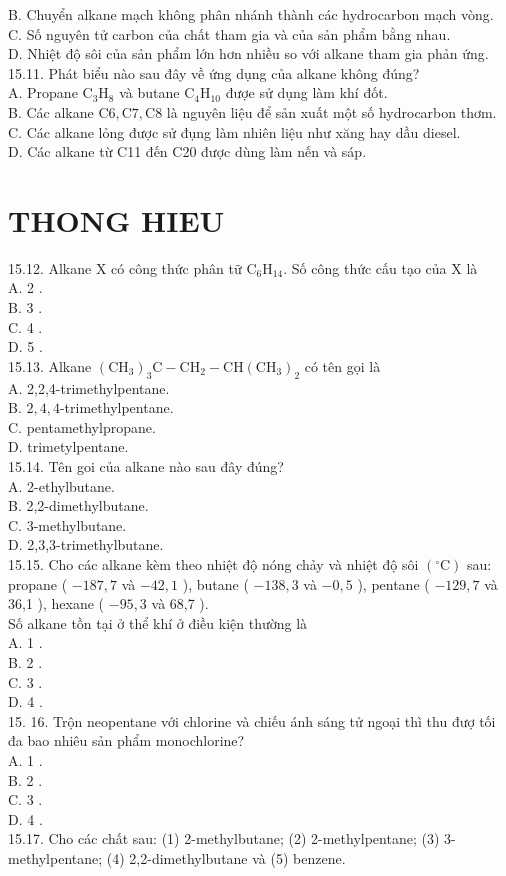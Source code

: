 \documentclass[10pt]{article}
\begin{document}
B. Chuyển alkane mạch không phân nhánh thành các hydrocarbon mạch vòng.\\
C. Số nguyên tử carbon của chất tham gia và của sản phẩm bằng nhau.\\
D. Nhiệt độ sôi của sản phẩm lớn hơn nhiều so với alkane tham gia phản ứng.\\
15.11. Phát biểu nào sau đây về ứng dụng của alkane không đúng?\\
A. Propane $\mathrm{C}_{3} \mathrm{H}_{8}$ và butane $\mathrm{C}_{4} \mathrm{H}_{10}$ đượe sử dụng làm khí đốt.\\
B. Các alkane $\mathrm{C} 6, \mathrm{C} 7, \mathrm{C} 8$ là nguyên liệu để sản xuất một số hydrocarbon thơm.\\
C. Các alkane lỏng được sử đụng làm nhiên liệu như xăng hay dầu diesel.\\
D. Các alkane từ C11 đến C20 được dùng làm nến và sáp.

\section*{THONG HIEU}
15.12. Alkane X có công thức phân tữ $\mathrm{C}_{6} \mathrm{H}_{14}$. Số công thức cấu tạo của X là\\
A. 2 .\\
B. 3 .\\
C. 4 .\\
D. 5 .\\
15.13. Alkane $\left(\mathrm{CH}_{3}\right)_{3} \mathrm{C}-\mathrm{CH}_{2}-\mathrm{CH}\left(\mathrm{CH}_{3}\right)_{2}$ có tên gọi là\\
A. 2,2,4-trimethylpentane.\\
B. $2,4,4$-trimethylpentane.\\
C. pentamethylpropane.\\
D. trimetylpentane.\\
15.14. Tên goi của alkane nào sau đây đúng?\\
A. 2-ethylbutane.\\
B. 2,2-dimethylbutane.\\
C. 3-methylbutane.\\
D. 2,3,3-trimethylbutane.\\
15.15. Cho các alkane kèm theo nhiệt độ nóng chảy và nhiệt độ sôi $\left({ }^{\circ} \mathrm{C}\right)$ sau: propane ( $-187,7$ và $-42,1$ ), butane ( $-138,3$ và $-0,5$ ), pentane ( $-129,7$ và 36,1 ), hexane ( $-95,3$ và 68,7 ).\\
Số alkane tồn tại ở thể khí ở điều kiện thường là\\
A. 1 .\\
B. 2 .\\
C. 3 .\\
D. 4 .\\
15. 16. Trộn neopentane với chlorine và chiếu ánh sáng tử ngoại thì thu đượ tối đa bao nhiêu sản phẩm monochlorine?\\
A. 1 .\\
B. 2 .\\
C. 3 .\\
D. 4 .\\
15.17. Cho các chất sau: (1) 2-methylbutane; (2) 2-methylpentane; (3) 3-methylpentane; (4) 2,2-dimethylbutane và (5) benzene.
\end{document}
